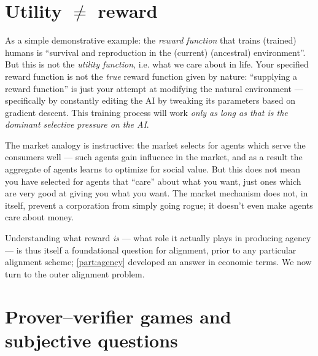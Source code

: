 \section*{Utility $\neq$ reward}

As a simple demonstrative example: the \emph{reward function} that trains (trained) humans is ``survival and reproduction in the (current) (ancestral) environment''. But this is not the \emph{utility function}, i.e. what we care about in life. Your specified reward function is not the \emph{true} reward function given by nature: ``supplying a reward function'' is just your attempt at modifying the natural environment --- specifically by constantly editing the AI by tweaking its parameters based on gradient descent. This training process will work \emph{only as long as that is the dominant selective pressure on the AI}.

The market analogy is instructive: the market selects for agents which serve the consumers well --- such agents gain influence in the market, and as a result the aggregate of agents learns to optimize for social value. But this does not mean you have selected for agents that ``care'' about what you want, just ones which are very good at giving you what you want. The market mechanism does not, in itself, prevent a corporation from simply going rogue; it doesn't even make agents care about money.

\begin{draftblock}
Understanding what reward \emph{is} --- what role it actually plays in producing agency --- is thus itself a foundational question for alignment, prior to any particular alignment scheme; \cref{part:agency} developed an answer in economic terms. We now turn to the outer alignment problem.
\end{draftblock}

\section*{Prover--verifier games and subjective questions}

